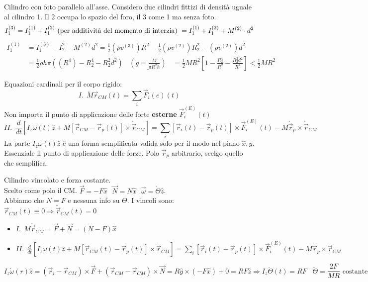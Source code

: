 \begin{example}
    Cilindro con foto parallelo all'asse. Considero due cilindri fittizi di densità uguale al cilindro 1. Il 2 
    occupa lo spazio del foro, il 3 come 1 ma senza foto.
    $$            
    I_1^{(3)} = I_1^{(1)} + I_1^{(2)} \text{ (per additività del momento di interzia) } = I_1^{(1)} + I_1^{(2)} + M^{(2)} \cdot d^2\\
    $$
    \begin{equation*}
        \begin{split}
            I_1^{(1)} & = I_1^{(3)} - I_2^{2} - M^{(2)} d^2 = \frac{1}{2}(\rho v^{(3)})R^2 - \frac{1}{2}(\rho v^{(2)})R_2^2 - (\rho v^{(2)})d^2\\
                      & = \frac{1}{2}\rho h \pi((R^4) - R_2^4 - R_2^2 d^2) \:\:\:\:\underline{(g=\frac{M}{\pi R^2h})} \:\:\:\:= \frac{1}{2}MR^2[1 - \frac{R_2^4}{R^2} - \frac{R_2^2d^2}{R^4}] < \frac{1}{2}MR^2
        \end{split}
    \end{equation*} 
\end{example}
\hspace{-15pt}Equazioni cardinali per il corpo rigido:
$$
I. \:\: \ddot{M}\vec{r}_{CM}(t) = \sum_{i}\vec{F}_i(e)(t)
$$
Non importa il punto di applicazione delle forte \textbf{esterne} $\vec{F}_i^{(E)}(t)$
$$
II. \:\: \frac{d}{dt}[I_z\omega(t)\hat{z} + M[\vec{r}_{CM} - \vec{r}_p(t)] \times \dot{\vec{r}}_{CM}] = \sum_{i}[\vec{r}_i(t) - \vec{r}_p(t)] \times \vec{F}_i^{(E)}(t) - M\dot{\vec{r}}_p  \times \dot{\vec{r}}_{CM} 
$$
La parte $I_z\omega(t)\hat{z}$ è una forma semplificata valida solo per il modo nel piano $\hat{x}, \hat{y}$. Essenziale il punto di applicazione delle forze.
Polo $\vec{r}_p$ arbitrario, scelgo quello che semplifica.

\begin{example}
    Cilindro vincolato e forza costante. \\
    Scelto come polo il CM. $\vec{F} = - F\hat{x} \:\:\: \vec{N}= N \hat{x} \:\:\: \vec{\omega} = \dot{\Theta}\hat{z}$.\\
    Abbiamo che $N = F$ e nessuna info su $\Theta$. I vincoli sono: $\vec{r}_{CM}(t) \equiv 0 \Rightarrow \ddot{\vec{r}}_{CM}(t) = 0$
    \begin{itemize}
        \item $I. \:\: M\ddot{\vec{r}}_{CM} = \vec{F} + \vec{N} = (N - F)\hat{x}$
        \item $II. \:\: \frac{d}{dt}[I_z\omega(t)\hat{z} + M[\vec{r}_{CM}(t) - \vec{r}_p(t)] \times \dot{\vec{r}}_{CM}] = \sum_{i}[\vec{r}_i(t) - \vec{r}_p(t)] \times \vec{F}_i^(E)(t) - M\dot{\vec{r}}_p \times \dot{\vec{r}}_{CM}$
    \end{itemize}
    $$I_z\dot{\omega}(r)\hat{z} = (\vec{r}_i - \vec{r}_{CM}) \times \vec{F} + (\vec{r}_{CM} - \vec{r}_{CM}) \times \vec{N} = R\hat{y} \times (-F\hat{x}) + 0 = RF\hat{z} \Rightarrow I_z\ddot{\Theta}(t) = RF \hspace{10pt}\ddot{\Theta} = \frac{2F}{MR} \text{ costante}$$
\end{example}

